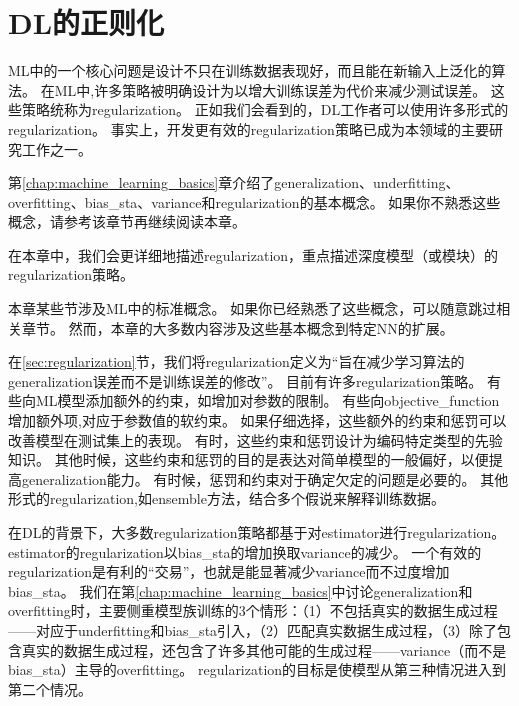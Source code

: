 \chapter{\gls{DL}的正则化}
\label{chap:regularization_for_deep_learning}
\gls{ML}中的一个核心问题是设计不只在训练数据表现好，而且能在新输入上泛化的算法。
在\gls{ML}中,许多策略被明确设计为以增大训练误差为代价来减少测试误差。
这些策略统称为\gls{regularization}。
正如我们会看到的，\gls{DL}工作者可以使用许多形式的\gls{regularization}。
事实上，开发更有效的\gls{regularization}策略已成为本领域的主要研究工作之一。

第\ref{chap:machine_learning_basics}章介绍了\gls{generalization}、\gls{underfitting}、\gls{overfitting}、\gls{bias_sta}、\gls{variance}和\gls{regularization}的基本概念。
如果你不熟悉这些概念，请参考该章节再继续阅读本章。

在本章中，我们会更详细地描述\gls{regularization}，重点描述深度模型（或模块）的\gls{regularization}策略。

本章某些节涉及\gls{ML}中的标准概念。
如果你已经熟悉了这些概念，可以随意跳过相关章节。
然而，本章的大多数内容涉及这些基本概念到特定\gls{NN}的扩展。

在\ref{sec:regularization}节，我们将\gls{regularization}定义为``旨在减少学习算法的\gls{generalization}误差而不是训练误差的修改''。
目前有许多\gls{regularization}策略。
有些向\gls{ML}模型添加额外的约束，如增加对参数的限制。
有些向\gls{objective_function}增加额外项,对应于参数值的软约束。
如果仔细选择，这些额外的约束和惩罚可以改善模型在测试集上的表现。
有时，这些约束和惩罚设计为编码特定类型的先验知识。
其他时候，这些约束和惩罚的目的是表达对简单模型的一般偏好，以便提高\gls{generalization}能力。
有时候，惩罚和约束对于确定欠定的问题是必要的。
其他形式的\gls{regularization},如\gls{ensemble}方法，结合多个假说来解释训练数据。


在\gls{DL}的背景下，大多数\gls{regularization}策略都基于对\gls{estimator}进行\gls{regularization}。
\gls{estimator}的\gls{regularization}以\gls{bias_sta}的增加换取\gls{variance}的减少。
一个有效的\gls{regularization}是有利的``交易''，也就是能显著减少\gls{variance}而不过度增加\gls{bias_sta}。
我们在第\ref{chap:machine_learning_basics}中讨论\gls{generalization}和\gls{overfitting}时，主要侧重模型族训练的3个情形：（1）不包括真实的数据生成过程——对应于\gls{underfitting}和\gls{bias_sta}引入，（2）匹配真实数据生成过程，（3）除了包含真实的数据生成过程，还包含了许多其他可能的生成过程——\gls{variance}（而不是\gls{bias_sta}）主导的\gls{overfitting}。
\gls{regularization}的目标是使模型从第三种情况进入到第二个情况。


